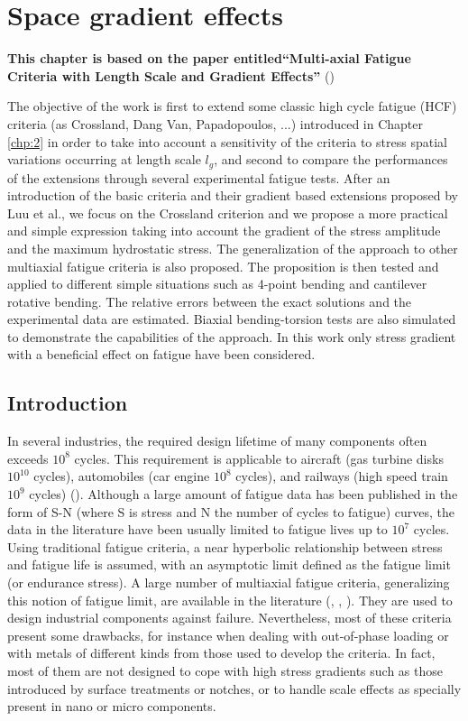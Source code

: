 \chapter{Space gradient effects}\label{chp:3}
\minitoc

\textbf{This chapter is based on the paper entitled``Multi-axial Fatigue Criteria with Length Scale and Gradient Effects'' }(\cite{zepeng2015multi})

The objective of the work is first to extend some classic high cycle fatigue (HCF) criteria (as Crossland, Dang Van, Papadopoulos, ...) introduced in Chapter \ref{chp:2} in order  to take into account a sensitivity of the criteria to stress spatial variations occurring at length scale $l_g$, and second to compare the performances of the extensions through several experimental fatigue tests. After an introduction of the basic criteria and their gradient based extensions proposed by Luu et al., we focus on the Crossland criterion and we  propose a more practical and simple expression taking into account the gradient of the stress amplitude and the maximum hydrostatic stress. The generalization of the approach to other multiaxial fatigue criteria is also proposed.  The proposition is then tested and applied to different simple situations such as 4-point bending and cantilever rotative bending.  The relative errors between the exact solutions and the experimental data are estimated. Biaxial  bending-torsion tests are also simulated to demonstrate the capabilities of the approach.  In this work only stress gradient with a beneficial effect on fatigue have been considered. 

\section{Introduction}

In several industries, the required design lifetime of many components often exceeds $ 10^8 $ cycles. This requirement is applicable to aircraft (gas turbine disks $ 10^{10} $ cycles), automobiles (car engine $ 10^8 $ cycles), and railways (high speed train $ 10^9 $ cycles) (\cite{wachtman2009mechanical}). Although a large amount of fatigue data has been published in the form of S-N (where S is stress and N  the number of cycles to fatigue) curves, the data in the literature have been usually limited to fatigue lives up to $ 10^7 $ cycles. Using traditional fatigue criteria, a near hyperbolic relationship between stress and fatigue life is assumed, with an asymptotic limit defined as the fatigue limit (or endurance stress). 
A large number of multiaxial fatigue criteria, generalizing this notion of fatigue limit, are available in the literature (\cite{Papadopoulos1997219}, \cite{ballard1995high}, \cite{suresh1998fatigue}). They are  used to design industrial components against failure. Nevertheless, most of these criteria present some drawbacks,  for instance when dealing with out-of-phase loading or with metals of different kinds from those used to develop the criteria. In fact, most of them are not designed to cope with high stress gradients such as those introduced  by surface treatments or notches, or to handle  scale effects as  specially present in nano or micro components. 

